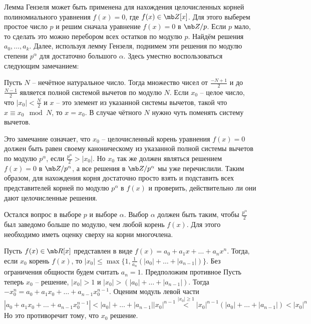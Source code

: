 Лемма Гензеля может быть применена для нахождения целочисленных корней полиномиального уравнения $f(x)=0$, где $f(x)\in \mb Z[x]$. Для этого выберем простое число $p$ и решим сначала уравнение $f(x)=0$ в $\mb Z/p$. Если $p$ мало, то сделать это можно перебором всех остатков по модулю $p$. Найдём решения $a_0,\dots,a_k$. Далее, используя лемму Гензеля, поднимем эти решения по модулю степени $p^{\alpha}$ для достаточно большого $\alpha$. Здесь уместно воспользоваться следующим замечанием:

\rm Пусть $N$ -- нечётное натуральное число. Тогда множество чисел от $\frac{-N+1}{2}$ и до $\frac{N-1}{2}$ является полной системой вычетов по модулю $N$. Если $x_0$ -- целое число, что $|x_0| <\frac{N}{2}$  и $x$ -- это элемент из указанной системы вычетов, такой что $x\equiv x_0 \mod N$, то $x=x_0$.
В случае чётного $N$ нужно чуть поменять систему вычетов.
\erm

Это замечание означает, что $x_0$ -- целочисленный корень уравнения $f(x)=0$ должен быть равен своему каноническому  из указанной полной системы вычетов по модулю $p^{\alpha}$, если $\frac{p^{\alpha}}{2}> |x_0|$. Но $x_0$ так же должен являться решением $f(x)=0$ в $\mb Z/p^{\alpha}$, а все решения в $\mb Z/p^{\alpha}$ мы уже перечислили. Таким образом, для нахождения корня достаточно просто взять и подставить всех представителей корней по модулю $p^{\alpha}$ в $f(x)$ и проверить, действительно ли они дают целочисленные решения.  

Остался вопрос в выборе $p$ и выборе $\alpha$. Выбор $\alpha$ должен быть таким, чтобы $\frac{p^\alpha}{2}$ был заведомо больше по модулю, чем любой корень $f(x)$. Для этого необходимо иметь оценку сверху на корни многочлена.

\lm Пусть $f(x) \in \mb R[x]$ представлен в виде $f(x)=a_0+a_1x+\dots+a_n x^n$. Тогда, если $x_0$ корень $f(x)$, то $|x_0|\leq \max\{1,\frac{1}{a_n}(|a_0|+\dots+|a_{n-1}|)\}$. 
\elm
\proof  Без ограничения общности будем считать $a_n=1$. Предположим противное Пусть теперь $x_0$ -- решение, $|x_0|> 1$ и $|x_0|> (|a_0|+\dots+|a_{n-1}|)$. Тогда $-x_0^n=a_0+a_1x_0+\dots+a_{n-1} x_0^{n-1}$. Оценим модуль левой части 
$$|a_0+a_1x_0+\dots+a_{n-1} x_0^{n-1}|< |a_0|+\dots+|a_{n-1}| |x_0|^{n-1} \stackrel{|x_0|\geq 1}{<} |x_0|^{n-1}(|a_0|+\dots+|a_{n-1}|) < |x_0|^n$$
Но это противоречит тому, что $x_0$ решение.
\endproof

